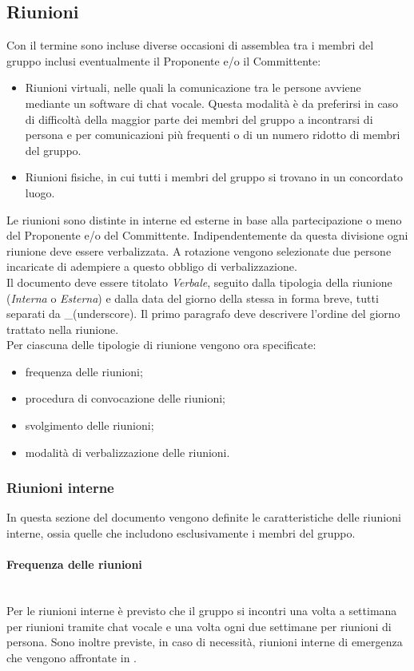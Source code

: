 \subsection{Riunioni}
Con il termine  sono incluse diverse occasioni di assemblea tra i membri del gruppo inclusi eventualmente il Proponente e/o il Committente:
\begin{itemize}
\item Riunioni virtuali, nelle quali la comunicazione tra le persone avviene mediante un software di chat vocale. Questa modalità è da preferirsi in caso di difficoltà della maggior parte dei membri del gruppo a incontrarsi di persona e per comunicazioni più frequenti o di un numero ridotto di membri del gruppo.
\item Riunioni fisiche, in cui tutti i membri del gruppo si trovano in un concordato luogo.	
\end{itemize}
Le riunioni sono distinte in interne ed esterne in base alla partecipazione o meno del Proponente e/o del Committente. Indipendentemente da questa divisione ogni riunione deve essere verbalizzata. A rotazione vengono selezionate due persone incaricate di adempiere a questo obbligo di verbalizzazione.\\
Il documento deve essere titolato \textit{Verbale}, seguito dalla tipologia della riunione (\textit{Interna} o \textit{Esterna}) e dalla data del giorno della stessa in forma breve, tutti separati da \_(underscore). Il primo paragrafo deve descrivere l'ordine del giorno trattato nella riunione.\\
Per ciascuna delle tipologie di riunione vengono ora specificate:
\begin{itemize}
	\item frequenza delle riunioni;
	\item procedura di convocazione delle riunioni;
	\item svolgimento delle riunioni;
	\item modalità di verbalizzazione delle riunioni.	 
\end{itemize}

\subsubsection{Riunioni interne}
In questa sezione del documento vengono definite le caratteristiche delle riunioni interne, ossia quelle che includono esclusivamente i membri del gruppo.

\paragraph{Frequenza delle riunioni}\mbox{}\\
Per le riunioni interne è previsto che il gruppo si incontri una volta a settimana per riunioni tramite chat vocale e una volta ogni due settimane per riunioni di persona. Sono inoltre previste, in caso di necessità, riunioni interne di emergenza che vengono affrontate in .

